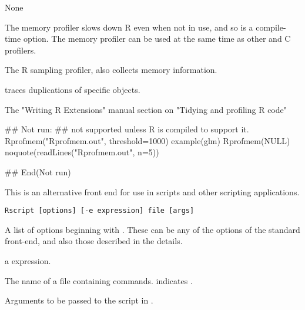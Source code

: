 %
\begin{Value}
None  
\end{Value}
%
\begin{Note}\relax
The memory profiler slows down R even when not in use, and so is a
compile-time option.
The memory profiler can be used at the same time as other \R{} and C profilers.

\end{Note}
%
\begin{SeeAlso}\relax
The R sampling profiler,  also collects
memory information.

 traces duplications of specific objects.

The "Writing R Extensions" manual section on "Tidying and profiling R code"
\end{SeeAlso}
%
\begin{Examples}
\begin{ExampleCode}
## Not run: 
## not supported unless R is compiled to support it.
Rprofmem("Rprofmem.out", threshold=1000)
example(glm)
Rprofmem(NULL)
noquote(readLines("Rprofmem.out", n=5))

## End(Not run)
\end{ExampleCode}
\end{Examples}
%
\begin{Description}\relax
This is an alternative front end for use in \samp{\#!} scripts and
other scripting applications.
\end{Description}
%
\begin{Usage}
\begin{verbatim}
Rscript [options] [-e expression] file [args]
\end{verbatim}
\end{Usage}
%
\begin{Arguments}
\begin{ldescription}
\item[\code{options}] A list of options beginning with \samp{--}.  These can
be any of the options of the standard \R{} front-end, and also those
described in the details.
\item[\code{expression}] a \R{} expression.
\item[\code{file}] The name of a file containing \R{} commands.  \samp{-}
indicates .
\item[\code{args}] Arguments to be passed to the script in .
\end{ldescription}
\end{Arguments}
